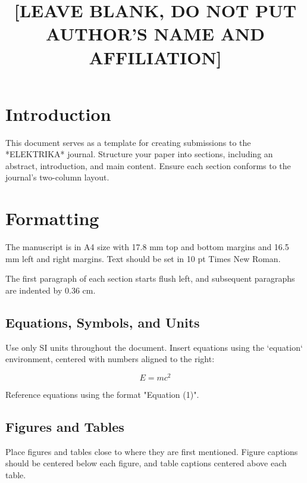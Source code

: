 \documentclass[10pt, twocolumn]{article}
\title{[LEAVE BLANK, DO NOT PUT AUTHOR’S NAME AND AFFILIATION]}
\date{}
\begin{document}

\section{Introduction}
\noindent
This document serves as a template for creating submissions to the *ELEKTRIKA* journal. Structure your paper into sections, including an abstract, introduction, and main content. Ensure each section conforms to the journal’s two-column layout.

\section{Formatting}
The manuscript is in A4 size with 17.8 mm top and bottom margins and 16.5 mm left and right margins. Text should be set in 10 pt Times New Roman. 

The first paragraph of each section starts flush left, and subsequent paragraphs are indented by 0.36 cm.

\subsection{Equations, Symbols, and Units}
Use only SI units throughout the document. Insert equations using the `equation` environment, centered with numbers aligned to the right:

\begin{equation}
    E = mc^2
\end{equation}

Reference equations using the format "Equation (1)".

\subsection{Figures and Tables}
Place figures and tables close to where they are first mentioned. Figure captions should be centered below each figure, and table captions centered above each table.
\end{document}
